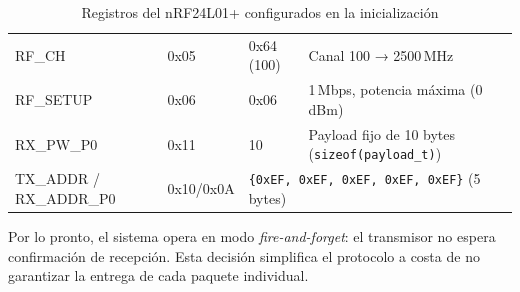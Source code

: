 \documentclass[12pt,a4paper]{article}
\begin{document}
\begin{table}[h]
\begin{tabular}{lllp{6.5cm}}
  RF\_CH     & 0x05 & 0x64 (100)  & Canal 100 → 2500\,MHz \\                                                                                                                                                                                                  
  RF\_SETUP  & 0x06 & 0x06        & 1\,Mbps, potencia máxima (0\,dBm) \\                                                                                                                                                                                      
  RX\_PW\_P0 & 0x11 & 10          & Payload fijo de 10 bytes (\texttt{sizeof(payload\_t)}) \\                                                                                                                                                                 
  TX\_ADDR / RX\_ADDR\_P0 & 0x10/0x0A & \multicolumn{2}{l}{\texttt{\{0xEF, 0xEF, 0xEF, 0xEF, 0xEF\}} (5 bytes)} \\                                                                                                                                            
  \hline                                                                                                                                                                                                                                                      
  \end{tabular}                                                                                                                                                                                                                                               
  \caption{Registros del nRF24L01+ configurados en la inicialización}                                                                                                                                                                                         
  \label{tab:nrf_regs}
  \end{table}                                                                                                                                                                                                                                                 
  
  Por lo pronto, el sistema opera en modo \textit{fire-and-forget}: el transmisor no espera confirmación de recepción. Esta decisión simplifica el protocolo a costa de no garantizar la entrega de cada paquete individual.                                                 
  
\end{document}
